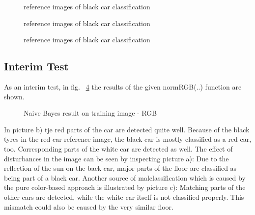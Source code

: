 \documentclass[a4paper,headings=small]{scrartcl}
\numberwithin{equation}{section} %
\numberwithin{figure}{section}   %
\newcommand{\imgRoot}{../resources/img}
\newcommand{\imgGeneratedRoot}{../../../target}
\begin{document}
\begin{figure}
 \hfill
{}
\caption{reference images of black car classification}
\label{fig:label1}
\end{figure}
\begin{figure}
\hfill
{}
\caption{reference images of black car classification}
\label{fig:label2}
\end{figure}
\begin{figure}
\hfill
{}
\caption{reference images of black car classification}
\label{fig:label3}
\end{figure}

\subsection{Interim Test}
As an interim test, in fig. ~\ref{fig:label5} the results of the given normRGB(..) function are shown.

\begin{figure}
\hfill
{}
\caption{Naive Bayes result on training image - RGB}
\label{fig:label5}
\end{figure}

In picture b) tje red parts of the car are detected quite well. Because of the black tyres in the red car reference image, the black car is mostly classified as a red car, too.
Corresponding parts of the white car are detected as well.
The effect of disturbances in the image can be seen by inspecting picture a): Due to the reflection of the sun on the back car, major parts of the floor are classified as being part of a black car.
Another source of malclassification which is caused by the pure color-based approach is illustrated by picture c): Matching parts of the other cars are detected, while the white car itself is not classified properly. This mismatch could also be caused by the very similar floor.
\end{document}
